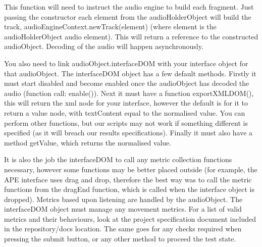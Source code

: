 \documentclass[11pt, oneside]{article}   	%
\begin{document}
This function will need to instruct the audio engine to build each fragment. Just passing the constructor each element from the audioHolderObject will build the track, audioEngineContext.newTrack(element) (where element is the audioHolderObject audio element). This will return a reference to the constructed audioObject. Decoding of the audio will happen asynchronously.

You also need to link audioObject.interfaceDOM with your interface object for that audioObject. The interfaceDOM object has a few default methods. Firstly it must start disabled and become enabled once the audioObject has decoded the audio (function call: enable()). Next it must have a function exportXMLDOM(), this will return the xml node for your interface, however the default is for it to return a value node, with textContent equal to the normalised value. You can perform other functions, but our scripts may not work if something different is specified (as it will breach our results specifications). Finally it must also have a method getValue, which returns the normalised value.

It is also the job the interfaceDOM to call any metric collection functions necessary, however some functions may be better placed outside (for example, the APE interface uses drag and drop, therefore the best way was to call the metric functions from the dragEnd function, which is called when the interface object is dropped). Metrics based upon listening are handled by the audioObject. The interfaceDOM object must manage any movement metrics. For a list of valid metrics and their behaviours, look at the project specification document included in the repository/docs location. The same goes for any checks required when pressing the submit button, or any other method to proceed the test state.
\end{document}
